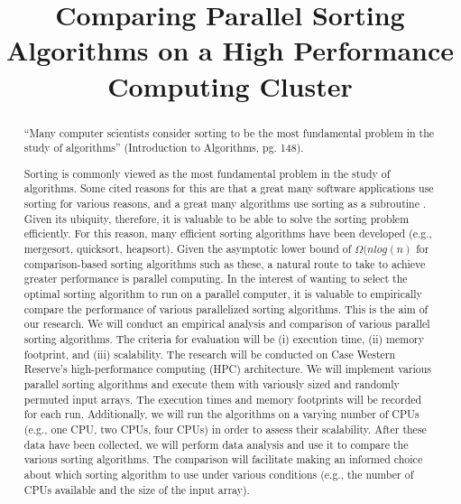 \documentclass[conference]{IEEEtran}
\begin{document}
		\title{Comparing Parallel Sorting Algorithms on a High Performance Computing Cluster}
			\author{
			\and
			\and
			\and
			}
	\maketitle
	
\begin{abstract}
“Many computer scientists consider sorting to be the most fundamental problem in the study of algorithms” (Introduction to Algorithms, pg. 148).

Sorting is commonly viewed as the most fundamental problem in the study of algorithms. Some cited reasons for this are that a great many software applications use sorting for various reasons, and a great many algorithms use sorting as a subroutine \cite{cormen_introduction_2009}. 
Given its ubiquity, therefore, it is valuable to be able to solve the sorting problem efficiently. 
For this reason, many efficient sorting algorithms have been developed (e.g., mergesort, quicksort, heapsort). 
Given the asymptotic lower bound of $\Omega(nlog(n)$ for comparison-based sorting algorithms such as these, a natural route to take to achieve greater performance is parallel computing. 
In the interest of wanting to select the optimal sorting algorithm to run on a parallel computer, it is valuable to empirically compare the performance of various parallelized sorting algorithms. 
This is the aim of our research. 
We will conduct an empirical analysis and comparison of various parallel sorting algorithms. 
The criteria for evaluation will be (i) execution time, (ii) memory footprint, and (iii) scalability. 
The research will be conducted on Case Western Reserve’s high-performance computing (HPC) architecture. 
We will implement various parallel sorting algorithms and execute them with variously sized and randomly permuted input arrays. The execution times and memory footprints will be recorded for each run. 
Additionally, we will run the algorithms on a varying number of CPUs (e.g., one CPU, two CPUs, four CPUs) in order to assess their scalability. 
After these data have been collected, we will perform data analysis and use it to compare the various sorting algorithms. 
The comparison will facilitate making an informed choice about which sorting algorithm to use under various conditions (e.g., the number of CPUs available and the size of the input array).
\end{abstract}
\end{document}
